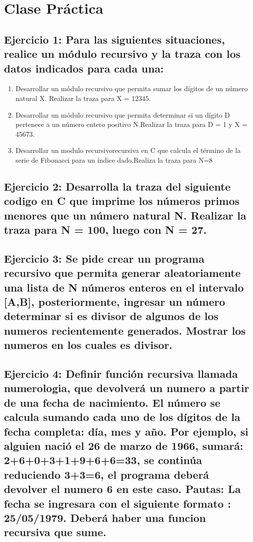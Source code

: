 \documentclass[a4paper]{article}
\begin{document}
\hfill

\section*{Clase Práctica
}
\subsection*{Ejercicio 1: Para las siguientes situaciones, realice un módulo recursivo y la traza con los 	datos indicados para cada una: }
\renewcommand{\theenumi}{\alph{enumi}}
\begin{enumerate}{}
	\item 	 Desarrollar un módulo recursivo que permita sumar los dígitos de un número natural X.	Realizar la traza para X = 12345.
	\item 	 Desarrollar un módulo recursivo que permita determinar si un dígito D pertenece a un número entero positivo N.Realizar la traza para D = 1 y X = 45673.
	\item  Desarrollar un modulo recursivorecursiva en C que calcula el término de la serie de Fibonacci para un índice dado.Realiza la traza para N=8 
	
	
\end{enumerate}
\subsection*{Ejercicio 2:  Desarrolla la traza del siguiente codigo en C que imprime los números primos menores que un número natural N.	Realizar la traza para N = 100, luego con N = 27.
}

\subsection*{Ejercicio 3:  Se pide crear un programa recursivo que permita generar aleatoriamente una lista de N números enteros en el intervalo [A,B], posteriormente, ingresar un número determinar si es divisor de algunos de los numeros recientemente generados. Mostrar los numeros en los cuales es divisor.}

\subsection*{Ejercicio 4:  Definir función recursiva llamada numerologia, que devolverá un numero a partir de una fecha de nacimiento. El número se calcula sumando cada uno de los dígitos de la fecha completa: día, mes y año. Por ejemplo, si alguien nació el 26 de marzo de 1966, sumará: 2+6+0+3+1+9+6+6=33, se continúa reduciendo 3+3=6, el programa deberá devolver el numero 6 en este caso.	Pautas:	La fecha se ingresara  con el siguiente formato : 25/05/1979.	Deberá haber una funcion recursiva que sume.}
\end{document}
